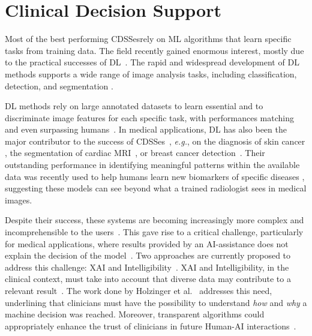 \section{Clinical Decision Support}
\label{sec:chap003003}

Most of the best performing \acp{CDSSe}\footnotemark[8] rely on \ac{ML} algorithms that learn specific tasks from training data.
The field recently gained enormous interest, mostly due to the practical successes of \ac{DL}~\cite{meacham2019towards}.
The rapid and widespread development of \ac{DL} methods supports a wide range of image analysis tasks, including classification, detection, and segmentation \cite{lecun2015deep}.


\ac{DL} methods rely on large annotated datasets to learn essential and to discriminate image features for each specific task, with performances matching and even surpassing humans~\cite{esteva2017dermatologist, McKinney2020}.
In medical applications, \ac{DL} has also been the major contributor to the success of \acp{CDSSe}~\cite{esteva2019guide}, {\it e.g.}, on the diagnosis of skin cancer \cite{esteva2017dermatologist}, the segmentation of cardiac \ac{MRI}~\cite{medley2019segmenting}, or breast cancer detection~\cite{MAICAS2019101562}.
Their outstanding performance in identifying meaningful patterns within the available data was recently used to help humans learn new biomarkers of specific diseases \cite{cole2017predicting, gonzalez2018deep, wang2019deep}, suggesting these models can see beyond what a trained radiologist sees in medical images.

Despite their success, these systems are becoming increasingly more complex and incomprehensible to the users~\cite{holzinger2019causability}.
This gave rise to a critical challenge, particularly for medical applications, where results provided by an \ac{AI}-assistance does not explain the decision of the model~\cite{shah2019artificial}.
Two approaches are currently proposed to address this challenge: \ac{XAI} and Intelligibility~\cite{gunning2017explainable, miller2018explanation}.
\ac{XAI} and Intelligibility, in the clinical context, must take into account that diverse data may contribute to a relevant result~\cite{Bharadhwaj:2019:ERS:3308557.3308699}.
The work done by Holzinger et al.~\cite{holzinger2018current} addresses this need, underlining that clinicians must have the possibility to understand {\it how} and {\it why} a machine decision was reached.
Moreover, transparent algorithms could appropriately enhance the trust of clinicians in future Human-AI interactions~\cite{Dominguez:2019:EEA:3301275.3302274, Weisz:2019:BTS:3301275.3302290}.

